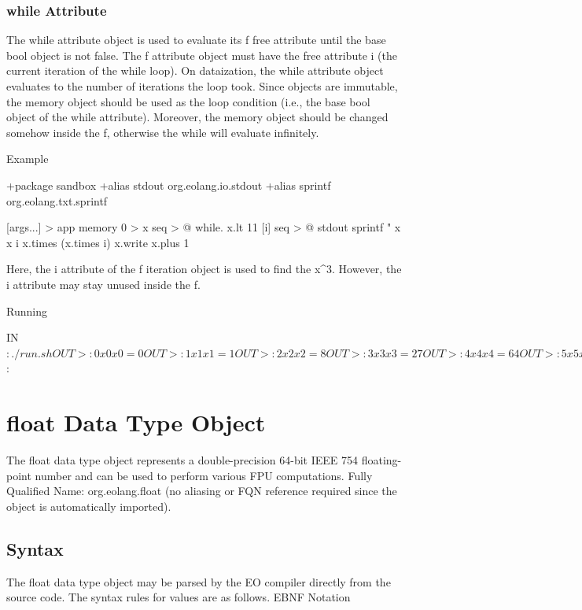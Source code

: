 \documentclass[12pt]{book}
\begin{document}
\subsubsection{while Attribute}
The while attribute object is used to evaluate its f free attribute until the base bool object is not false.
The f attribute object must have the free attribute i (the current iteration of the while loop).
On dataization, the while attribute object evaluates to the number of iterations the loop took.
Since objects are immutable, the memory object should be used as the loop condition (i.e., the base bool object of the while attribute). Moreover, the memory object should be changed somehow inside the f, otherwise the while will evaluate infinitely.

Example
\begin{ffcode}
+package sandbox
+alias stdout org.eolang.io.stdout
+alias sprintf org.eolang.txt.sprintf

[args...] > app
  memory 0 > x
  seq > @
    while.
      x.lt 11
      [i]
        seq > @
          stdout
            sprintf "%
              x
              x
              i
              x.times (x.times i)
          x.write
            x.plus 1
          
Here, the i attribute of the f iteration object is 
used to find the x^3. However, the i attribute may 
stay unused inside the f.

Running

IN$: ./run.sh
OUT>: 0 x 0 x 0 = 0
OUT>: 1 x 1 x 1 = 1
OUT>: 2 x 2 x 2 = 8
OUT>: 3 x 3 x 3 = 27
OUT>: 4 x 4 x 4 = 64
OUT>: 5 x 5 x 5 = 125
OUT>: 6 x 6 x 6 = 216
OUT>: 7 x 7 x 7 = 343
OUT>: 8 x 8 x 8 = 512
OUT>: 9 x 9 x 9 = 729
OUT>: 10 x 10 x 10 = 1000
IN$: 
\end{ffcode}

\section{float Data Type Object}
The float data type object represents a double-precision 64-bit IEEE 754 floating-point number and can be used to perform various FPU computations.
Fully Qualified Name: org.eolang.float (no aliasing or FQN reference required since the object is automatically imported).

\subsection{Syntax}
The float data type object may be parsed by the EO compiler directly from the source code. The syntax rules for values are as follows.
EBNF Notation
\end{document}

